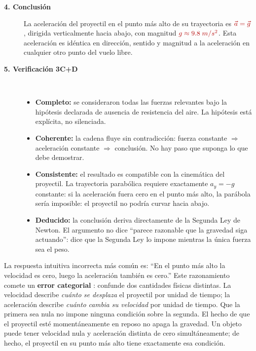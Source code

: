 \documentclass[11pt]{book}
\newcommand{\incog}[1]{\textcolor{colIncog}{#1}}
\begin{document}
\begin{enumerate}
\begin{description}
\begin{description}
    \item[\textbf{4. Conclusión}]
    La aceleración del proyectil en el punto más alto de su trayectoria es $\incog{\vec{a} = \vec{g}}$, dirigida verticalmente hacia abajo, con magnitud $\incog{g \approx 9.8\;m/s^2}$. Esta aceleración es idéntica en dirección, sentido y magnitud a la aceleración en cualquier otro punto del vuelo libre.

    \item[\textbf{5. Verificación 3C+D}]~
    \begin{itemize}
        \item {\bf Completo:} se consideraron todas las fuerzas relevantes bajo la hipótesis declarada de ausencia de resistencia del aire. La hipótesis está explícita, no silenciada.
        \item {\bf Coherente:} la cadena fluye sin contradicción: fuerza constante $\Rightarrow$ aceleración constante $\Rightarrow$ conclusión. No hay paso que suponga lo que debe demostrar.
        \item {\bf Consistente:} el resultado es compatible con la cinemática del proyectil. La trayectoria parabólica requiere exactamente $a_y = -g$ constante: si la aceleración fuera cero en el punto más alto, la parábola sería imposible: el proyectil no podría curvar hacia abajo.
        \item {\bf Deducido:} la conclusión deriva directamente de la Segunda Ley de Newton. El argumento no dice ``parece razonable que la gravedad siga actuando'': dice que la Segunda Ley lo impone mientras la única fuerza sea el peso.
    \end{itemize}
\end{description}

\medskip
{}

\medskip
La respuesta intuitiva incorrecta más común es: ``En el punto más alto la velocidad es cero, luego la aceleración también es cero.'' Este razonamiento comete un {\bf error categorial} \cite{Mestre2020}: confunde dos cantidades físicas distintas. La velocidad describe {\it cuánto se desplaza} el proyectil por unidad de tiempo; la aceleración describe {\it cuánto cambia su velocidad} por unidad de tiempo. Que la primera sea nula no impone ninguna condición sobre la segunda. El hecho de que el proyectil esté momentáneamente en reposo no apaga la gravedad. Un objeto puede tener velocidad nula y aceleración distinta de cero simultáneamente; de hecho, el proyectil en su punto más alto tiene exactamente esa condición.


\end{description}
\end{enumerate}
\end{document}

